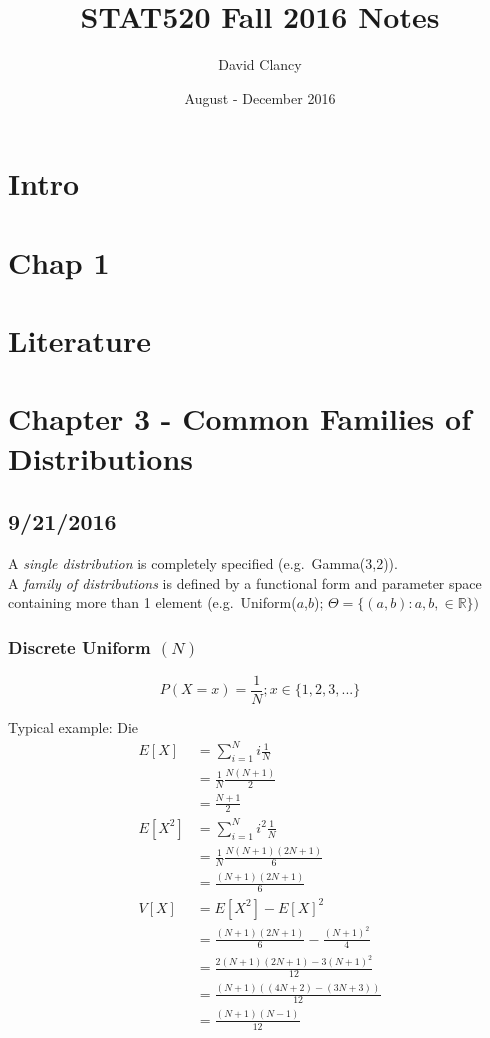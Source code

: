\documentclass[]{book}
\title{STAT520 Fall 2016 Notes}
\author{David Clancy}
\date{August - December 2016}
\let\BeginKnitrBlock\begin \let\EndKnitrBlock\end
\begin{document}
\maketitle

{
\setcounter{tocdepth}{1}
\tableofcontents
}
\chapter{Intro}\label{intro}

\chapter{Chap 1}\label{ch1}

\chapter{Literature}\label{literature}

\chapter{Chapter 3 - Common Families of Distributions}\label{ch3}

\section{9/21/2016}\label{section}

\BeginKnitrBlock{rmddefinition}
A \emph{single distribution} is completely specified
(e.g.~Gamma(3,2)).\\
A \emph{family of distributions} is defined by a functional form and
parameter space containing more than 1 element
(e.g.~Uniform(\(a\),\(b\));
\(\Theta = \{(a,b) : a,b, \in \mathbb{R}\})\)
\EndKnitrBlock{rmddefinition}

\subsection{\texorpdfstring{Discrete Uniform
\((N)\)}{Discrete Uniform (N)}}\label{discrete-uniform-n}

\[P(X = x) = \frac{1}{N}; x \in \{1,2,3,...\}\]

Typical example: Die\\
\[
\begin{aligned}
  E[X] &= \sum_{i=1}^N i\frac{1}{N} \\
    &= \frac{1}{N}\frac{N(N+1)}{2} \\
    &=\frac{N+1}{2} \\
  E[X^2] &= \sum_{i=1}^N i^2\frac{1}{N} \\
    &= \frac{1}{N}\frac{N(N+1)(2N + 1)}{6} \\
    &= \frac{(N+1)(2N+1)}{6} \\
  V[X] &= E[X^2] - E[X]^2 \\
    &= \frac{(N+1)(2N+1)}{6} - \frac{(N+1)^2}{4} \\
    &= \frac{2(N+1)(2N+1) - 3(N+1)^2}{12} \\
    &= \frac{(N+1)((4N+2) - (3N+3))}{12} \\
    &= \frac{(N+1)(N-1)}{12}
\end{aligned}
\]
\end{document}
